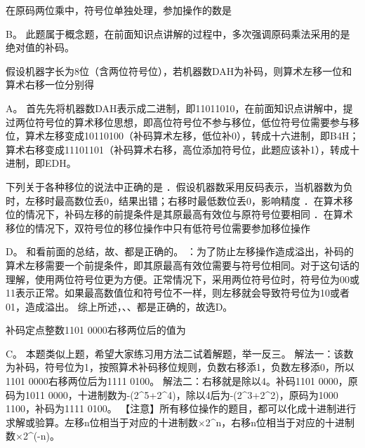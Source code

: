 \question 在原码两位乘中，符号位单独处理，参加操作的数是
\par{}
\begin{solution}B。
此题属于概念题，在前面知识点讲解的过程中，多次强调原码乘法采用的是绝对值的补码。
\end{solution}
\question 假设机器字长为8位（含两位符号位），若机器数DAH为补码，则算术左移一位和算术右移一位分别得
\par{}
\begin{solution}A。
首先先将机器数DAH表示成二进制，即11011010，在前面知识点讲解中，提过两位符号位的算术移位思想，即高位符号位不参与移位，低位符号位需要参与移位，算术左移变成10110100（补码算术左移，低位补0），转成十六进制，即B4H；算术右移变成11101101（补码算术右移，高位添加符号位，此题应该补1），转成十进制，即EDH。
\end{solution}
\question 下列关于各种移位的说法中正确的是
．假设机器数采用反码表示，当机器数为负时，左移时最高数位丢0，结果出错；右移时最低数位丢0，影响精度
．在算术移位的情况下，补码左移的前提条件是其原最高有效位与原符号位要相同
．在算术移位的情况下，双符号位的移位操作中只有低符号位需要参加移位操作
\par{}
\begin{solution}D。 和看前面的总结，故、都是正确的。
：为了防止左移操作造成溢出，补码的算术左移需要一个前提条件，即其原最高有效位需要与符号位相同。对于这句话的理解，使用两位符号位更为方便。正常情况下，采用两位符号位时，符号位为00或11表示正常。如果最高数值位和符号位不一样，则左移就会导致符号位为10或者01，造成溢出。
综上所述，、、都是正确的，故选D。
\end{solution}
\question 补码定点整数1101 0000右移两位后的值为
\par{}
\begin{solution}C。 本题类似上题，希望大家练习用方法二试着解题，举一反三。
解法一：该数为补码，符号位为1，按照算术补码移位规则，负数右移添1，负数左移添0，所以1101
0000右移两位后为1111 0100。 解法二：右移就是除以4。补码1101
0000，原码为1011
0000，十进制数为-(2\^{}5+2\^{}4)，除以4后为-(2\^{}3+2\^{}2)，原码为1000
1100，补码为1111 0100。
【注意】所有移位操作的题目，都可以化成十进制进行求解或验算。左移n位相当于对应的十进制数×2\^{}n，右移n位相当于对应的十进制数×2\^{}(-n)。
\end{solution}
